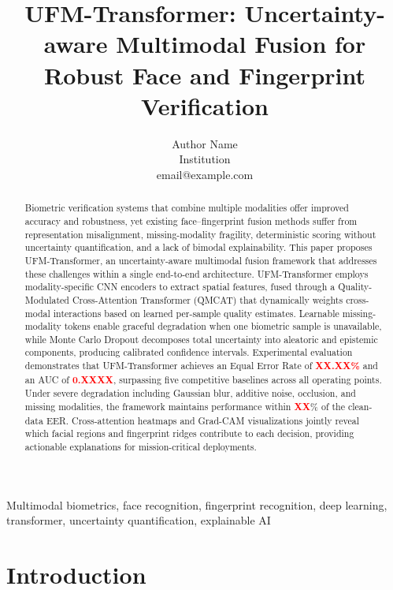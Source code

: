 \documentclass[10pt,journal,compsoc]{IEEEtran}
\begin{document}
\title{UFM-Transformer: Uncertainty-aware Multimodal Fusion for Robust Face and Fingerprint Verification}
\author{Author Name\\Institution\\email@example.com}
\maketitle

\begin{abstract}
Biometric verification systems that combine multiple modalities offer improved accuracy and robustness, yet existing face--fingerprint fusion methods suffer from representation misalignment, missing-modality fragility, deterministic scoring without uncertainty quantification, and a lack of bimodal explainability. This paper proposes UFM-Transformer, an uncertainty-aware multimodal fusion framework that addresses these challenges within a single end-to-end architecture. UFM-Transformer employs modality-specific CNN encoders to extract spatial features, fused through a Quality-Modulated Cross-Attention Transformer (QMCAT) that dynamically weights cross-modal interactions based on learned per-sample quality estimates. Learnable missing-modality tokens enable graceful degradation when one biometric sample is unavailable, while Monte Carlo Dropout decomposes total uncertainty into aleatoric and epistemic components, producing calibrated confidence intervals. Experimental evaluation demonstrates that UFM-Transformer achieves an Equal Error Rate of \textcolor{red}{\textbf{XX.XX\%}} and an AUC of \textcolor{red}{\textbf{0.XXXX}}, surpassing five competitive baselines across all operating points. Under severe degradation including Gaussian blur, additive noise, occlusion, and missing modalities, the framework maintains performance within \textcolor{red}{\textbf{XX}}\% of the clean-data EER. Cross-attention heatmaps and Grad-CAM visualizations jointly reveal which facial regions and fingerprint ridges contribute to each decision, providing actionable explanations for mission-critical deployments.
\end{abstract}

\begin{IEEEkeywords}
Multimodal biometrics, face recognition, fingerprint recognition, deep learning, transformer, uncertainty quantification, explainable AI
\end{IEEEkeywords}

\section{Introduction}
\label{sec:intro}
\end{document}
